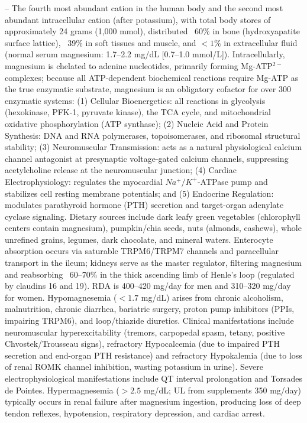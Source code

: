 -- The fourth most abundant cation in the human body and the second most abundant intracellular cation (after potassium), with total body stores of approximately 24 grams (1,000 mmol), distributed ~60\% in bone (hydroxyapatite surface lattice), ~39\% in soft tissues and muscle, and $<1\%$ in extracellular fluid (normal serum magnesium: 1.7--2.2 mg/dL [0.7--1.0 mmol/L]). Intracellularly, magnesium is chelated to adenine nucleotides, primarily forming Mg-ATP$^{2-}$ complexes; because all ATP-dependent biochemical reactions require Mg-ATP as the true enzymatic substrate, magnesium is an obligatory cofactor for over 300 enzymatic systems: (1) Cellular Bioenergetics: all reactions in glycolysis (hexokinase, PFK-1, pyruvate kinase), the TCA cycle, and mitochondrial oxidative phosphorylation (ATP synthase); (2) Nucleic Acid and Protein Synthesis: DNA and RNA polymerases, topoisomerases, and ribosomal structural stability; (3) Neuromuscular Transmission: acts as a natural physiological calcium channel antagonist at presynaptic voltage-gated calcium channels, suppressing acetylcholine release at the neuromuscular junction; (4) Cardiac Electrophysiology: regulates the myocardial $Na^+/K^+$-ATPase pump and stabilizes cell resting membrane potentials; and (5) Endocrine Regulation: modulates parathyroid hormone (PTH) secretion and target-organ adenylate cyclase signaling. Dietary sources include dark leafy green vegetables (chlorophyll centers contain magnesium), pumpkin/chia seeds, nuts (almonds, cashews), whole unrefined grains, legumes, dark chocolate, and mineral waters. Enterocyte absorption occurs via saturable TRPM6/TRPM7 channels and paracellular transport in the ileum; kidneys serve as the master regulator, filtering magnesium and reabsorbing ~60--70\% in the thick ascending limb of Henle's loop (regulated by claudins 16 and 19). RDA is 400--420 mg/day for men and 310--320 mg/day for women. Hypomagnesemia ($<1.7$ mg/dL) arises from chronic alcoholism, malnutrition, chronic diarrhea, bariatric surgery, proton pump inhibitors (PPIs, impairing TRPM6), and loop/thiazide diuretics. Clinical manifestations include neuromuscular hyperexcitability (tremors, carpopedal spasm, tetany, positive Chvostek/Trousseau signs), refractory Hypocalcemia (due to impaired PTH secretion and end-organ PTH resistance) and refractory Hypokalemia (due to loss of renal ROMK channel inhibition, wasting potassium in urine). Severe electrophysiological manifestations include QT interval prolongation and Torsades de Pointes. Hypermagnesemia ($>2.5$ mg/dL; UL from supplements 350 mg/day) typically occurs in renal failure after magnesium ingestion, producing loss of deep tendon reflexes, hypotension, respiratory depression, and cardiac arrest.

